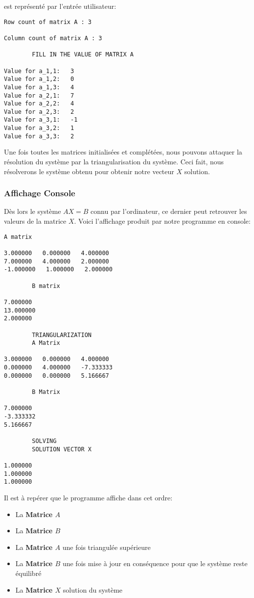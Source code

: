 est représenté par l'entrée utilisateur:
\begin{lstlisting}[caption=User Input, basicstyle=\fontsize{8}{10}\selectfont]
Row count of matrix A : 3

Column count of matrix A : 3

		FILL IN THE VALUE OF MATRIX A 

Value for a_1,1:   3
Value for a_1,2:   0
Value for a_1,3:   4
Value for a_2,1:   7
Value for a_2,2:   4
Value for a_2,3:   2
Value for a_3,1:   -1
Value for a_3,2:   1
Value for a_3,3:   2

\end{lstlisting}
Une fois toutes les matrices initialisées et complétées, nous pouvons attaquer la résolution du système par la triangularisation du système. Ceci fait, nous résolverons le système obtenu pour obtenir notre vecteur $X$ solution.\\
\subsubsection{Affichage Console}
Dès lors le système $AX=B$ connu par l'ordinateur, ce dernier peut retrouver les valeurs de la matrice $X$. Voici l'affichage produit par notre programme en console: \\
\begin{lstlisting}[caption=Console Display of the Gauss elimination for the AX=B system mentioned above, basicstyle=\fontsize{8}{10}\selectfont]
		A matrix 

3.000000   0.000000   4.000000   
7.000000   4.000000   2.000000   
-1.000000   1.000000   2.000000   

		B matrix 

7.000000   
13.000000   
2.000000   

		TRIANGULARIZATION 
		A Matrix 

3.000000   0.000000   4.000000   
0.000000   4.000000   -7.333333   
0.000000   0.000000   5.166667   

		B Matrix 

7.000000   
-3.333332   
5.166667   

		SOLVING 
		SOLUTION VECTOR X 

1.000000   
1.000000   
1.000000   

\end{lstlisting}
Il est à repérer que le programme affiche dans cet ordre: \\
\begin{itemize}
\item La \textbf{Matrice $A$}
\item La \textbf{Matrice $B$}
\item La \textbf{Matrice $A$} une fois triangulée supérieure
\item La \textbf{Matrice $B$} une fois mise à jour en conséquence pour que le système reste équilibré
\item La \textbf{Matrice $X$} solution du système
\end{itemize}

